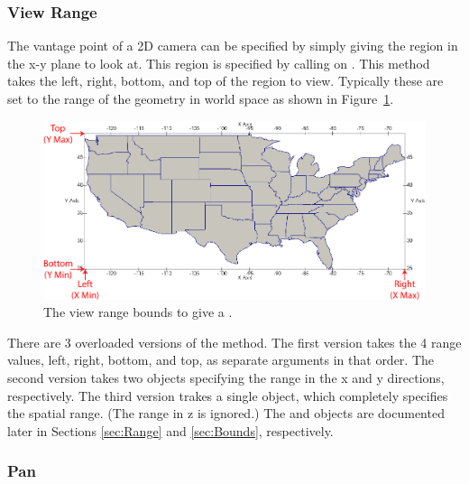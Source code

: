 \subsubsection{View Range}


The vantage point of a 2D camera can be specified by simply giving the
region in the x-y plane to look at. This region is specified by calling
 on . This method takes the
left, right, bottom, and top of the region to view. Typically these are set
to the range of the geometry in world space as shown in
Figure~\ref{fig:CameraViewRange2D}.

\begin{figure}[htb]
  \centering
  \includegraphics{images/CameraViewRange2D}
  \caption{The view range bounds to give a .}
  \label{fig:CameraViewRange2D}
\end{figure}

There are 3 overloaded versions of the  method.
The first version takes the 4 range values, left, right, bottom, and top,
as separate arguments in that order. The second version takes two
 objects specifying the range in the x and y directions,
respectively. The third version trakes a single  object, which
completely specifies the spatial range. (The range in z is ignored.) The
 and  objects are documented
later in Sections \ref{sec:Range} and \ref{sec:Bounds}, respectively.


\subsubsection{Pan}


